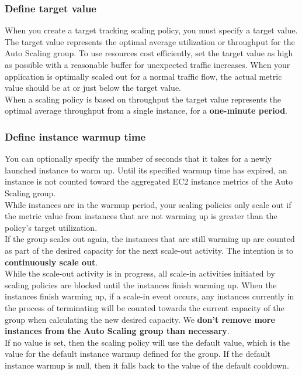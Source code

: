 \documentclass[12pt, letterpaper, twoside]{article}
\begin{document}
\subsubsection{Define target value}
When you create a target tracking scaling policy, you must specify a target value. The target value represents the optimal average 
utilization or throughput for the Auto Scaling group. To use resources cost efficiently, set the target value as high as possible 
with a reasonable buffer for unexpected traffic increases. When your application is optimally scaled out for a normal traffic 
flow, the actual metric value should be at or just below the target value.\\

When a scaling policy is based on throughput the target value represents the optimal average throughput from a single instance, 
for a \textbf{one-minute period}.\\

\subsubsection{Define instance warmup time}
You can optionally specify the number of seconds that it takes for a newly launched instance to warm up. Until its specified warmup 
time has expired, an instance is not counted toward the aggregated EC2 instance metrics of the Auto Scaling group.\\

While instances are in the warmup period, your scaling policies only scale out if the metric value from instances that are not 
warming up is greater than the policy's target utilization.\\
If the group scales out again, the instances that are still warming up are counted as part of the desired capacity for the next 
scale-out activity. The intention is to \textbf{continuously scale out}.\\
While the scale-out activity is in progress, all scale-in activities initiated by scaling policies are blocked until the instances 
finish warming up. When the instances finish warming up, if a scale-in event occurs, any instances currently in the process of 
terminating will be counted towards the current capacity of the group when calculating the new desired capacity. We \textbf{don't
remove more instances from the Auto Scaling group than necessary}.\\
If no value is set, then the scaling policy will use the default value, which is the value for the default instance warmup defined 
for the group. If the default instance warmup is null, then it falls back to the value of the default cooldown.\\
\end{document}
